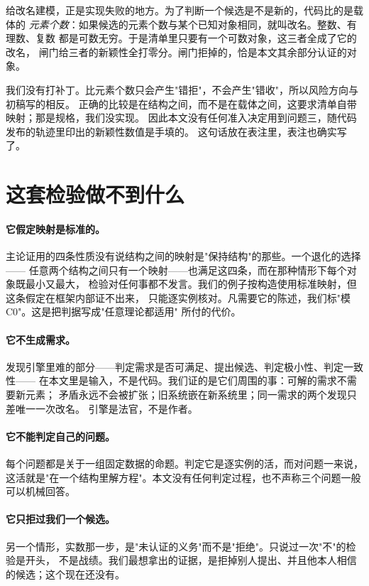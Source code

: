 \documentclass[aps,prd,preprint,superscriptaddress,amsmath,amssymb]{revtex4-2}
\begin{document}
给改名建模，正是实现失败的地方。为了判断一个候选是不是新的，代码比的是载体的
\emph{元素个数}：如果候选的元素个数与某个已知对象相同，就叫改名。整数、有理数、复数
都是可数无穷。于是清单里只要有一个可数对象，这三者全成了它的改名，
闸门给三者的新颖性全打零分。闸门拒掉的，恰是本文其余部分认证的对象。

我们没有打补丁。比元素个数只会产生"错拒"，不会产生"错收"，所以风险方向与初稿写的相反。
正确的比较是在结构之间，而不是在载体之间，这要求清单自带映射；那是规格，我们没实现。
因此本文没有任何准入决定用到问题三，随代码发布的轨迹里印出的新颖性数值是手填的。
这句话放在表注里，表注也确实写了。

\section{这套检验做不到什么}
\label{sec:limits}

\paragraph{它假定映射是标准的。}
主论证用的四条性质没有说结构之间的映射是"保持结构"的那些。一个退化的选择——
任意两个结构之间只有一个映射——也满足这四条，而在那种情形下每个对象既最小又最大，
检验对任何事都不发言。我们的例子按构造使用标准映射，但这条假定在框架内部证不出来，
只能逐实例核对。凡需要它的陈述，我们标"模 C0"。这是把判据写成"任意理论都适用"
所付的代价。

\paragraph{它不生成需求。}
发现引擎里难的部分——判定需求是否可满足、提出候选、判定极小性、判定一致性——
在本文里是输入，不是代码。我们证的是它们周围的事：可解的需求不需要新元素；
矛盾永远不会被扩张；旧系统嵌在新系统里；同一需求的两个发现只差唯一一次改名。
引擎是法官，不是作者。

\paragraph{它不能判定自己的问题。}
每个问题都是关于一组固定数据的命题。判定它是逐实例的活，而对问题一来说，
这活就是"在一个结构里解方程"。本文没有任何判定过程，也不声称三个问题一般可以机械回答。

\paragraph{它只拒过我们一个候选。}
另一个情形，实数那一步，是"未认证的义务"而不是"拒绝"。只说过一次"不"的检验是开头，
不是战绩。我们最想拿出的证据，是拒掉别人提出、并且他本人相信的候选；这个现在还没有。
\end{document}
